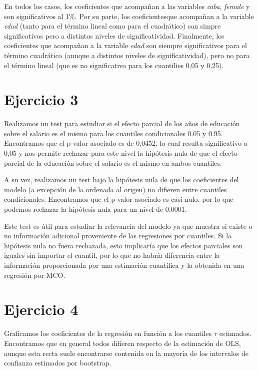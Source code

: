 \documentclass[12pt]{article}
\begin{document}
En todos los casos, los coeficientes que acompañan a las variables \emph{caba}, \emph{female} y son significativos al 1\%. Por su parte, los coeficientesque acompañan a la variable \emph{edad} (tanto para el término lineal como para el cuadrático) son simpre significativos pero a distintos niveles de significatividad. Finalmente, los coeficientes que acompañan a la variable \emph{edad} son siempre significativos para el término cuadrático (aunque a distintos niveles de significatividad), pero no para el término lineal (que es no significativo para los cuantilies 0,05 y 0,25). 

\section*{Ejercicio 3}

Realizamos un test para estudiar si el efecto parcial de los años de educación sobre el salario es el mismo para los cuantiles condicionales 0.05 y 0.95. Encontramos que el p-valor asociado es de 0,0452, lo cual resulta significativo a 0,05 y nos permite rechazar para este nivel la hipótesis nula de que el efecto parcial de la educación sobre el salario es el mismo en ambos cuantiles.

A su vez, realizamos un test bajo la hipótesis nula de que los coeficientes del modelo (a excepción de la ordenada al origen) no difieren entre cuantiles condicionales. Encontramos que el p-valor asociado es casi nulo, por lo que podemos rechazar la hipótesis nula para un nivel de 0,0001. 

Este test es útil para estudiar la relevancia del modelo ya que muestra si existe o no información adicional proveniente de las regresiones por cuantiles. Si la hipótesis nula no fuera rechazada, esto implicaría que los efectos parciales son iguales sin importar el cuantil, por lo que no habría diferencia entre la información proporcionada por una estimación cuantílica y la obtenida en una regresión por MCO.

\section*{Ejercicio 4}

Graficamos los coeficientes de la regresión en función a los cuantiles $\tau$ estimados. Encontramos que en general todos difieren respecto de la estimación de OLS, aunque esta recta suele encontrarse contenida en la mayoría de los intervalos de confianza estimados por bootstrap. 
\end{document}
